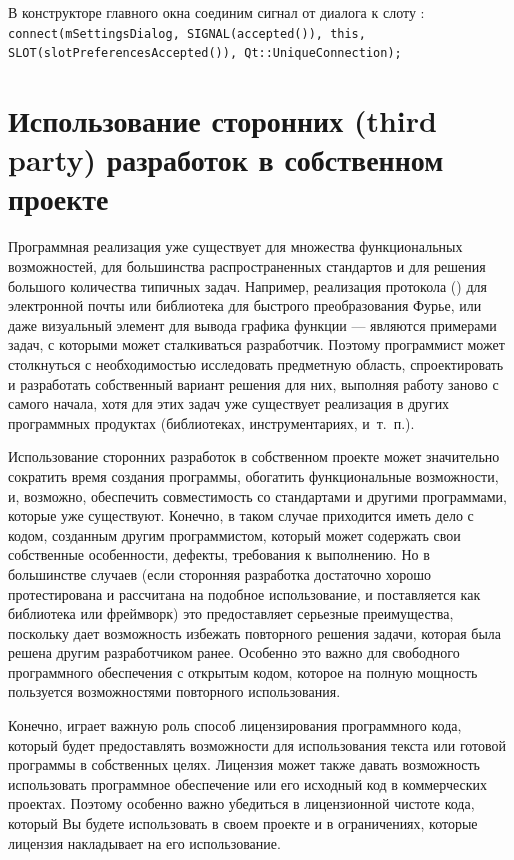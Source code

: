 В конструкторе главного окна соединим сигнал  от диалога к слоту
:
\lstinline!connect(mSettingsDialog, SIGNAL(accepted()), this, SLOT(slotPreferencesAccepted()), Qt::UniqueConnection);!

\section[Использование сторонних разработок в собственном проекте]{Использование сторонних (third party) разработок в собственном проекте}
Программная реализация уже существует для множества функциональных возможностей, для большинства распространенных
стандартов и для решения большого количества типичных задач. Например, 
реализация протокола  () для электронной почты или 
библиотека для быстрого преобразования Фурье, или даже визуальный элемент для
вывода графика функции --- являются примерами задач, с которыми может сталкиваться разработчик. Поэтому программист может
столкнуться с необходимостью исследовать предметную область, спроектировать и разработать собственный вариант решения
для них, выполняя работу заново с самого начала, хотя для этих задач уже существует реализация в других программных
продуктах (библиотеках, инструментариях, и~т.~п.). 

Использование сторонних разработок в собственном проекте может значительно сократить время создания программы, обогатить
функциональные возможности, и, возможно, обеспечить совместимость со стандартами и другими программами, которые уже
существуют. Конечно, в таком случае приходится иметь дело с кодом, созданным другим программистом, который может
содержать свои собственные особенности, дефекты, требования к выполнению. Но в большинстве случаев (если сторонняя
разработка достаточно хорошо протестирована и рассчитана на подобное использование, и поставляется  как библиотека или
фреймворк) это предоставляет серьезные преимущества, поскольку дает возможность избежать повторного решения задачи,
которая была решена другим разработчиком ранее. Особенно это важно для свободного программного обеспечения с открытым
кодом, которое на полную мощность пользуется возможностями повторного использования. 

Конечно, играет важную роль способ лицензирования программного кода, который будет предоставлять возможности для
использования текста или готовой программы в собственных целях. Лицензия может также давать возможность использовать
программное обеспечение или его исходный код в коммерческих проектах. Поэтому особенно важно убедиться в лицензионной
чистоте кода, который Вы будете использовать в своем проекте и в ограничениях, которые лицензия накладывает на его
использование.

